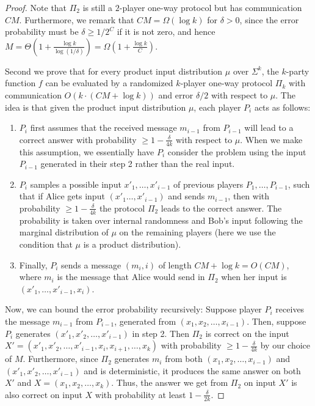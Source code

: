\documentclass[11pt]{article}
\numberwithin{equation}{section}
\theoremstyle{definition}
\theoremstyle{plain}
\newcommand{\error}{\ensuremath{\delta}}
\newcommand{\bigo}[1]{\ensuremath{{{O} \left( {#1} \right)}}}
\newcommand{\bigomega}[1]{\ensuremath{{\Omega \left( {#1} \right)}}}
\newcommand{\bigtheta}[1]{\ensuremath{{\Theta\left({#1} \right)}}}
\newcommand{\alphabet}{\ensuremath{\Sigma}}
\begin{document}
\begin{proof}
Note that $\Pi_2$ is still a $2$-player one-way protocol but has communication ${CM}$. 
Furthermore, we remark that $CM=\bigomega{\log k}$ for $\error>0$, since the error probability must be $\error\ge 1/2^C$ if it is not zero, and hence $M=\bigtheta{1+\frac{\log k}{\log(1/\error)}}=\bigomega{1+\frac{\log k}{C}}$.




Second we prove that for every product input distribution $\mu$ over $\alphabet^k$, the $k$-party function $f$ can be evaluated by a randomized $k$-player one-way protocol $\Pi_k$ with communication $\bigo{k\cdot (CM+\log k)}$ and error $\error/2$ with respect to $\mu$.
The idea is that given the product input distribution $\mu$, each player $P_i$ acts as follows:
\begin{enumerate}
	\item $P_i$ first assumes that the received message $m_{i-1}$ from $P_{i-1}$ will lead to a correct answer with probability $\ge 1-\frac{\error}{4k}$ with respect to $\mu$. When we make this assumption, we essentially have $P_i$ consider the problem using the input $P_{i-1}$ generated in their step 2 rather than the real input.

	\item $P_i$ samples a possible input $x'_1,\dots,x'_{i-1}$ of previous players $P_1,\dots, P_{i-1}$, such that if Alice gets input $(x'_1\dots, x'_{i-1})$ and sends $m_{i-1}$, then with probability $\ge 1-\frac{\error}{4k}$ the protocol $\Pi_2$ leads to the correct answer. 
	The probability is taken over internal randomness and Bob's input following the marginal distribution of $\mu$ on the remaining players (here we use the condition that $\mu$ is a product distribution).

	\item Finally, $P_i$ sends a message $(m_i,i)$ of length $CM+\log k = \bigo{CM}$, where $m_i$ is the message that Alice would send in $\Pi_2$ when her input is $(x'_1,\dots,x'_{i-1},x_i)$.
\end{enumerate}

{\color{black} Now, we can bound the error probability recursively: Suppose player $P_i$ receives the message $m_{i-1}$ from $P_{i-1}$, generated from $(x_1, x_2, \dots, x_{i-1})$. Then, suppose $P_i$ generates $(x'_1, x'_2, \dots, x'_{i-1})$ in step 2. Then $\Pi_2$ is correct on the input $X' = (x'_1, x'_2, \dots, x'_{i-1}, x_i, x_{i+1}, \dots, x_k)$ with probability $\ge 1-\frac{\delta}{4k}$ by our choice of $M$. Furthermore, since $\Pi_2$ generates $m_i$ from both $(x_1, x_2, \dots, x_{i-1})$ and $(x'_1, x'_2, \dots, x'_{i-1})$ and is deterministic, it produces the same answer on both $X'$ and $X = (x_1, x_2, \dots, x_k)$. Thus, the answer we get from $\Pi_2$ on input $X'$ is also correct on input $X$ with probability at least $1-\frac{\error}{2k}$.}


\end{proof}
\end{document}
